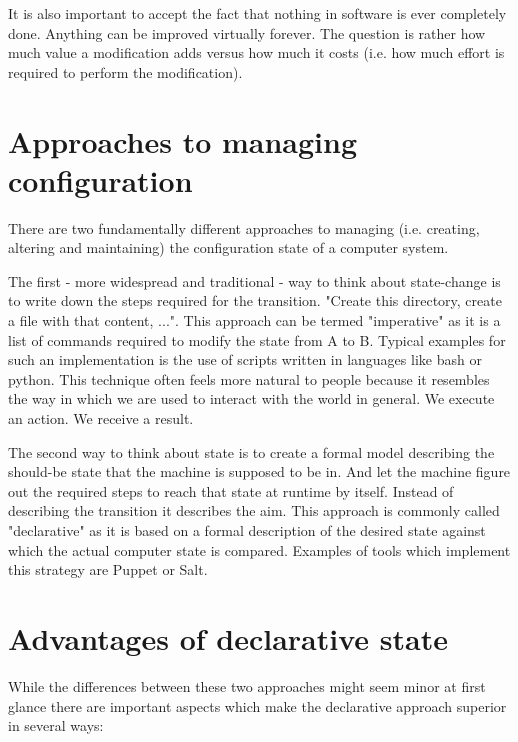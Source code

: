 \documentclass[12pt, a4paper]{article}
\begin{document}
It is also important to accept the fact that nothing in software is ever completely done. Anything can be improved virtually forever. The question is rather how much value a modification adds versus how much it costs (i.e. how much effort is required to perform the modification).

\section{Approaches to managing configuration}
There are two fundamentally different approaches to managing (i.e. creating, altering and maintaining) the configuration state of a computer system.

The first - more widespread and traditional - way to think about state-change is to write down the steps required for the transition. "Create this directory, create a file with that content, ...". This approach can be termed "imperative" as it is a list of commands required to modify the state from A to B. Typical examples for such an implementation is the use of scripts written in languages like bash or python. This technique often feels more natural to people because it resembles the way in which we are used to interact with the world in general. We execute an action. We receive a result.

The second way to think about state is to create a formal model describing the should-be state that the machine is supposed to be in. And let the machine figure out the required steps to reach that state at runtime by itself. Instead of describing the transition it describes the aim. This approach is commonly called "declarative" as it is based on a formal description of the desired state against which the actual computer state is compared. Examples of tools which implement this strategy are Puppet or Salt.

\section{Advantages of declarative state}
While the differences between these two approaches might seem minor at first glance there are important aspects which make the declarative approach superior in several ways:
\end{document}
